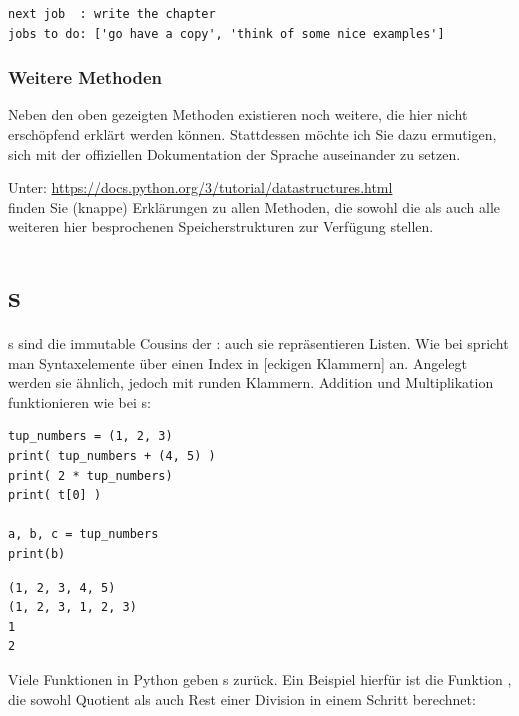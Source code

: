 \begin{cmdbox}[Ausgabe]
\begin{verbatim}
next job  : write the chapter
jobs to do: ['go have a copy', 'think of some nice examples']
\end{verbatim}
\end{cmdbox}

\subsubsection{Weitere Methoden}
Neben den oben gezeigten Methoden existieren noch weitere, die hier nicht erschöpfend erklärt werden können. Stattdessen möchte ich Sie dazu ermutigen, sich mit der offiziellen Dokumentation der Sprache auseinander zu setzen. 

Unter:\newline
\url{https://docs.python.org/3/tutorial/datastructures.html}\\
finden Sie (knappe) Erklärungen zu allen Methoden, die sowohl die  als auch alle weiteren hier besprochenen Speicherstrukturen zur Verfügung stellen.

\section{s}
s sind die immutable Cousins der : auch sie repräsentieren Listen. Wie bei  spricht man Syntaxelemente über einen Index in [eckigen Klammern] an. Angelegt werden sie ähnlich, jedoch mit runden Klammern. Addition und Multiplikation funktionieren wie bei s:

\begin{codebox}
\begin{verbatim}
tup_numbers = (1, 2, 3)
print( tup_numbers + (4, 5) )
print( 2 * tup_numbers)
print( t[0] )

a, b, c = tup_numbers
print(b)
\end{verbatim}
\end{codebox}

\begin{cmdbox}[Ausgabe]
\begin{verbatim}
(1, 2, 3, 4, 5)
(1, 2, 3, 1, 2, 3)
1
2
\end{verbatim}
\end{cmdbox}

Viele Funktionen in Python geben s zurück. Ein Beispiel hierfür ist die Funktion , die sowohl Quotient als auch Rest einer Division in einem Schritt berechnet:

